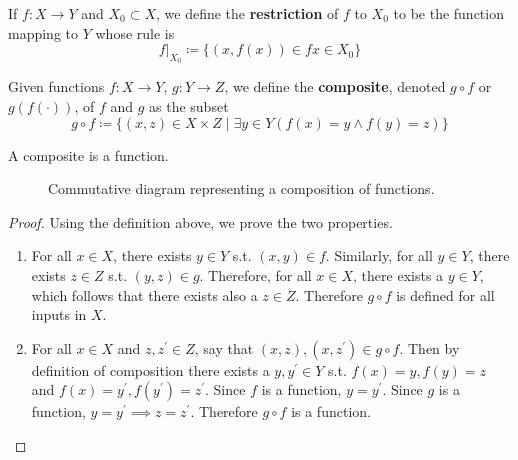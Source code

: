 \documentclass{article}
\begin{document}
    \begin{definition}[Restriction]
      If $f: X \rightarrow Y$ and $X_0 \subset X$, we define the \textbf{restriction} of $f$ to $X_0$ to be the function mapping to $Y$ whose rule is 
      \begin{equation}
        f|_{X_0} \coloneqq \{ (x, f(x)) \in f x \in X_0 \}
      \end{equation}
    \end{definition} 

    \begin{definition}[Composition]
      Given functions $f: X \rightarrow Y$, $g: Y \rightarrow Z$, we define the \textbf{composite}, denoted $g \circ f$ or $g(f(\cdot))$, of $f$ and $g$ as the subset
      \begin{equation}
        g \circ f \coloneqq \{ (x, z) \in X \times Z \mid \exists y \in Y (f(x) = y \land f(y) = z) \}
      \end{equation} 
    \end{definition}

    \begin{theorem}[Compositions]
      A composite is a function. 
      \begin{figure}[H]
        \centering 
        \caption{Commutative diagram representing a composition of functions.} 
        \label{fig:composition}
      \end{figure}
    \end{theorem}
    \begin{proof}
      Using the definition above, we prove the two properties. 
      \begin{enumerate}
        \item For all $x \in X$, there exists $y \in Y$ s.t. $(x, y) \in f$. Similarly, for all $y \in Y$, there exists $z \in Z$ s.t. $(y, z) \in g$. Therefore, for all $x \in X$, there exists a $y \in Y$, which follows that there exists also a $z \in Z$. Therefore $g \circ f$ is defined for all inputs in $X$. 
        \item For all $x \in X$ and $z, z^\prime \in Z$, say that $(x, z), (x, z^\prime) \in g \circ f$. Then by definition of composition there exists a $y, y^\prime \in Y$ s.t. $f(x) = y, f(y) = z$ and $f(x) = y^\prime, f(y^\prime) = z^\prime$. Since $f$ is a function, $y = y^\prime$. Since $g$ is a function, $y = y^\prime \implies z = z^\prime$. Therefore $g \circ f$ is a function. 
      \end{enumerate}
    \end{proof}
\end{document}
